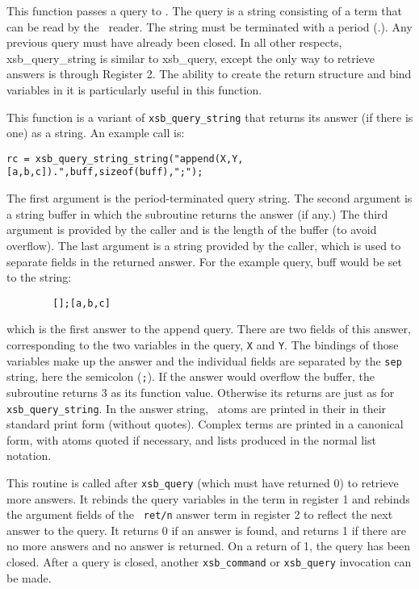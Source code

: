 \begin{description}
 
This function passes a query to \ourprolog .  The query is a string
consisting of a term that can be read by the \ourprolog\ reader.  The
string must be terminated with a period (.).  Any previous query must
have already been closed.  In all other respects, xsb\_query\_string
is similar to xsb\_query, except the only way to retrieve answers is
through Register 2.  The ability to create the return structure and
bind variables in it is particularly useful in this function.

  This function
is a variant of {\tt xsb\_query\_string} that returns its answer (if
there is one) as a string.  An example call is:
\begin{verbatim}
rc = xsb_query_string_string("append(X,Y,[a,b,c]).",buff,sizeof(buff),";");
\end{verbatim}
The first argument is the period-terminated query string.  The second
argument is a string buffer in which the subroutine returns the answer
(if any.)  The third argument is provided by the caller and is the
length of the buffer (to avoid overflow).  The last argument is a string
provided by the caller, which is used to separate fields in the returned
answer.  For the example query, buff would be set to the string:
\begin{verbatim}
        [];[a,b,c]
\end{verbatim}
which is the first answer to the append query.  There are two fields of
this answer, corresponding to the two variables in the query, \verb|X|
and \verb|Y|.  The bindings of those variables make up the answer and
the individual fields are separated by the \verb|sep| string, here the
semicolon (\verb|;|).  If the answer would overflow the buffer, the
subroutine returns 3 as its function value.  Otherwise its returns are
just as for {\tt xsb\_query\_string}.  In the answer string, \ourprolog\
atoms are printed in their in their standard print form (without
quotes).  Complex terms are printed in a canonical form, with atoms
quoted if necessary, and lists produced in the normal list notation.

 
This routine is called after {\tt xsb\_query} (which must have
returned 0) to retrieve more answers.  It rebinds the query variables
in the term in register 1 and rebinds the argument fields of the {\tt
ret/n} answer term in register 2 to reflect the next answer to the
query.  It returns 0 if an answer is found, and returns 1 if there are
no more answers and no answer is returned. On a return of 1, the query
has been closed.  After a query is closed, another {\tt xsb\_command}
or {\tt xsb\_query} invocation can be made.


\end{description}
